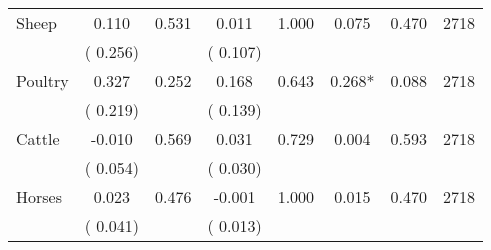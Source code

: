 \begin{tabular}{l*{7}{c}}
 Sheep       &              0.110       &        0.531  &              0.011       &        1.000  &              0.075       &              0.470 &  2718 \\ 
                       &       (       0.256)             &                               &       (       0.107)                     &                               &                                               &                                &                      \\ 

 Poultry       &              0.327       &        0.252  &              0.168       &        0.643  &              0.268*       &              0.088 &  2718 \\ 
                       &       (       0.219)             &                               &       (       0.139)                     &                               &                                               &                                &                      \\ 

 Cattle       &             -0.010       &        0.569  &              0.031       &        0.729  &              0.004       &              0.593 &  2718 \\ 
                       &       (       0.054)             &                               &       (       0.030)                     &                               &                                               &                                &                      \\ 

 Horses       &              0.023       &        0.476  &             -0.001       &        1.000  &              0.015       &              0.470 &  2718 \\ 
                       &       (       0.041)             &                               &       (       0.013)                     &                               &                                               &                                &                      \\ 

\hline \end{tabular}